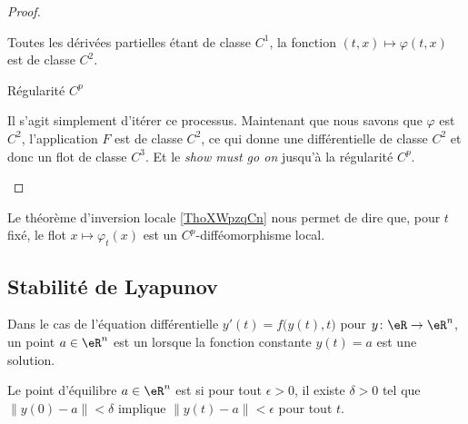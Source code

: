 \begin{proof}
\begin{subproof}
        Toutes les dérivées partielles étant de classe \( C^1\), la fonction \( (t,x)\mapsto \varphi(t,x)\) est de classe \( C^2\).


    \item[Régularité \( C^p\)]

        Il s'agit simplement d'itérer ce processus. Maintenant que nous savons que \( \varphi\) est \( C^2\), l'application \( F\) est de classe \( C^2\), ce qui donne une différentielle de classe \( C^2\) et donc un flot de classe \( C^3\). Et le \emph{show must go on} jusqu'à la régularité \( C^p\).

    \end{subproof}
\end{proof}

Le théorème d'inversion locale \ref{ThoXWpzqCn} nous permet de dire que, pour \( t\) fixé, le flot \( x\mapsto \varphi_t(x)\) est un \( C^p\)-difféomorphisme local.

\subsection{Stabilité de Lyapunov}

\begin{definition}  \label{DefKMCGooOeFKlA}
    Dans le cas de l'équation différentielle \( y'(t)=f\big( y(t),t \big)\) pour \( y\colon \eR\to \eR^n\), un point \( a\in \eR^n\) est un  lorsque la fonction constante \( y(t)=a\) est une solution.

    Le point d'équilibre \( a\in \eR^n\) est  si pour tout \( \epsilon>0\), il existe \( \delta>0\) tel que \( \| y(0)-a \|<\delta\) implique \( \| y(t)-a \|<\epsilon\) pour tout \( t\).
\end{definition}

